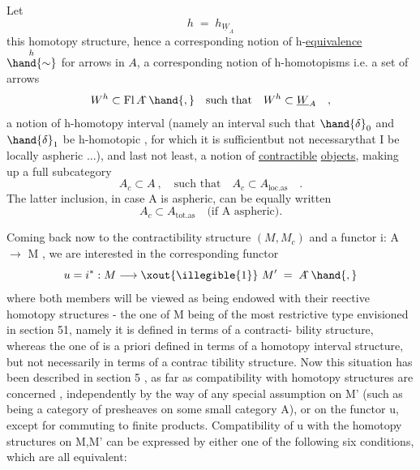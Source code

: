 
Let
\[ h \;=\; h_{\underline{W}_A} \]
this homotopy structure, hence a corresponding notion of h-\uline{equivalence} \hand{)}
$\overset{h}{\hand{\sim}}$ for arrows in $A\hat{}$, a corresponding notion of h-homotopisms i.e.
a set of arrows
\[ W^h \subset \mathrm{Fl}\,A\hat{}\ \hand{,} \quad \text{such that} \quad W^h \subset \underline{W}_A \quad , \]
a notion  of h-homotopy interval (namely an interval such that $\hand{\delta}_0$ and $\hand{\delta}_1$
be  h-homotopic , for which it is sufficient\hand{,}but not necessary\hand{,}that I
be locally aspheric ...), and last not least, a notion of \uline{contractible}
\uline{objects}, making up a full subcategory
\[ A\hat{}_c \subset A\hat{}\ , \quad \text{such that} \quad A\hat{}_c \subset A\hat{}_{\mathrm{loc.as}} \quad . \]
The latter inclusion, in case A is aspheric, can be equally written
\[ A\hat{}_c \subset A\hat{}_{\mathrm{tot.as}} \quad \text{(if A aspheric).} \]

Coming back now to the contractibility structure $(M,M_c)$\hand{,} and a
functor  i: A $\longrightarrow$ M , we are interested in the corresponding functor
\[ u = i^* : M \longrightarrow \xout{\illegible{1}}\ M' \;=\; A\hat{}\ \hand{,} \]
where both members will be viewed as being endowed with their reective
homotopy structures  -  the one of M being of the most restrictive type
envisioned in section 51, namely it is  defined in terms of a contracti-%
bility structure, whereas the one of is a priori defined in terms of
a homotopy interval structure, but not necessarily in terms of a contrac
tibility structure. Now this situation has been described in section
5 , as far as compatibility with homotopy structures are concerned ,
independently by the way of any special assumption on M'  (such as being
a category of presheaves on some small category A), or on the functor
u, except for commuting to finite products. Compatibility of u  with
the homotopy structures on M,M'  can be expressed by either one of the
following six conditions, which are all equivalent:

